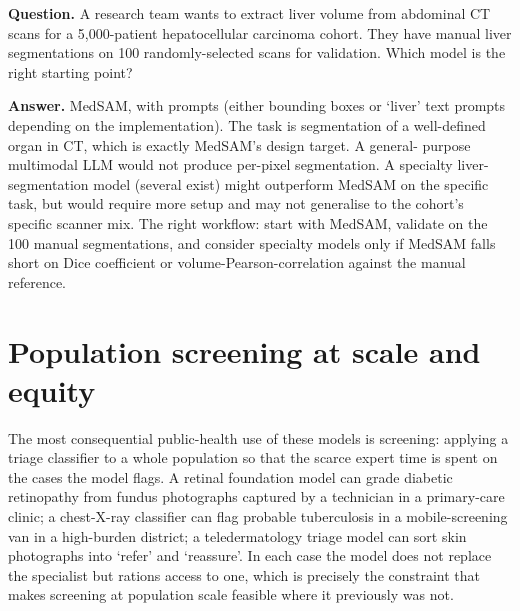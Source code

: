 \documentclass[
  letterpaper,
  11pt]{scrbook}
\begin{document}
\begin{tcolorbox}[enhanced jigsaw, arc=.35mm, bottomrule=.15mm, bottomtitle=1mm, breakable, colback=white, colbacktitle=quarto-callout-note-color!10!white, colframe=quarto-callout-note-color-frame, coltitle=black, left=2mm, leftrule=.75mm, opacityback=0, opacitybacktitle=0.6, rightrule=.15mm, title={Check your understanding: model selection by modality}, titlerule=0mm, toprule=.15mm, toptitle=1mm]

\textbf{Question.} A research team wants to extract liver volume from
abdominal CT scans for a 5,000-patient hepatocellular carcinoma cohort.
They have manual liver segmentations on 100 randomly-selected scans for
validation. Which model is the right starting point?

\textbf{Answer.} MedSAM, with prompts (either bounding boxes or `liver'
text prompts depending on the implementation). The task is segmentation
of a well-defined organ in CT, which is exactly MedSAM's design target.
A general- purpose multimodal LLM would not produce per-pixel
segmentation. A specialty liver-segmentation model (several exist) might
outperform MedSAM on the specific task, but would require more setup and
may not generalise to the cohort's specific scanner mix. The right
workflow: start with MedSAM, validate on the 100 manual segmentations,
and consider specialty models only if MedSAM falls short on Dice
coefficient or volume-Pearson-correlation against the manual reference.

\end{tcolorbox}

\section{Population screening at scale and
equity}\label{population-screening-at-scale-and-equity}

The most consequential public-health use of these models is screening:
applying a triage classifier to a whole population so that the scarce
expert time is spent on the cases the model flags. A retinal foundation
model can grade diabetic retinopathy from fundus photographs captured by
a technician in a primary-care clinic; a chest-X-ray classifier can flag
probable tuberculosis in a mobile-screening van in a high-burden
district; a teledermatology triage model can sort skin photographs into
`refer' and `reassure'. In each case the model does not replace the
specialist but rations access to one, which is precisely the constraint
that makes screening at population scale feasible where it previously
was not.
\end{document}
